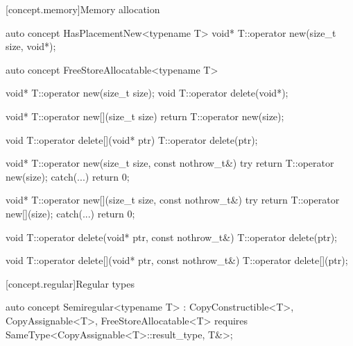 \documentclass[american,twoside]{book}
\begin{document}
[concept.memory]{Memory allocation}
\begin{itemdecl}
auto concept HasPlacementNew<typename T> {
  void* T::operator new(size_t size, void*);
}
\end{itemdecl}

\begin{itemdescr}
\pnum
{}
\end{itemdescr}

\begin{itemdecl}
auto concept FreeStoreAllocatable<typename T> {
  void* T::operator new(size_t size);
  void T::operator delete(void*);

  void* T::operator new[](size_t size) {
    return T::operator new(size);
  }

  void T::operator delete[](void* ptr) {
    T::operator delete(ptr);
  }

  void* T::operator new(size_t size, const nothrow_t&) {
    try {
      return T::operator new(size);
    } catch(...) {
      return 0;
    }
  }

  void* T::operator new[](size_t size, const nothrow_t&) {
    try {
      return T::operator new[](size);
    } catch(...) {
      return 0;
    }
  }

  void T::operator delete(void* ptr, const nothrow_t&) {
    T::operator delete(ptr);
  }

  void T::operator delete[](void* ptr, const nothrow_t&) {
    T::operator delete[](ptr);
  }
}
\end{itemdecl}

\begin{itemdescr}
\pnum
{}
\end{itemdescr}

[concept.regular]{Regular types}

\begin{itemdecl}
auto concept Semiregular<typename T> 
  : CopyConstructible<T>, CopyAssignable<T>, FreeStoreAllocatable<T> { 
  requires SameType<CopyAssignable<T>::result_type, T&>;
}
\end{itemdecl}

\begin{itemdescr}
\pnum 
{}
\end{itemdescr}
\end{document}
